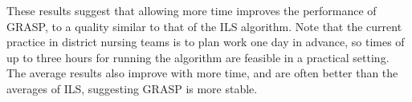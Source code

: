 \documentclass[a4paper,11pt,authoryear]{elsarticle}
\begin{document}
\noindent These results suggest that allowing more time improves the performance of GRASP, to a quality similar to that of the ILS algorithm. Note that the current practice in district nursing teams is to plan work one day in advance, so times of up to three hours for running the algorithm are feasible in a practical setting. The average results also improve with more time, and are often better than the averages of ILS, suggesting GRASP is more stable.

\begin{comment}
\begin{algorithm}[htbp!]
\footnotesize
\caption{\textsc{FindValidTime}$(i, j, f, a(i,j))$}
\label{alg:oldfindvalidtime}
\begin{algorithmic}[1]
\State \chng{all $e/l_j^{(i')}$ need to change to $e/l_j^{(j')}$ where $j'$ is the other dep/ds job done by nurse $i'$}
\State $\tilde{f} \gets f$
\State $\tilde{a}(i,j) \gets a(i,j)$
\State valid $\gets \False$
\State DS $\gets \False$
\State second $\gets \False$
\If{$j$ is a double service}
\State DS $\gets \True$
\State $i' \gets$ other nurse assigned to $j$
\If{$i$ appears later than $i'$ in $\mathcal{O}$}
\State second $\gets \True$
\If{$\tilde{a}(i,j) > l_j^{(i')}$} %
\State valid $\gets \False$
\Return
\EndIf
\EndIf
\EndIf %
\While{$\Not$ valid}
\State $\tilde{f} \gets \tilde{f}+1$
\State $\tilde{a}(i,j) \gets u(\pi_{\tilde{f}}^{i})$
\If{\chng{DS $= \True$ or j is synchronised}} %
\If{second $= \False$}
\If{$\tilde{a}(i,j) + s_j > v(\pi_{\tilde{f}}^{i}) \AAnd \tilde{f} \neq g_i$}
\Continue
\Else
\State valid $\gets \True$
\State $t_j \gets \tilde{a}(i,j)$
\State $w_{ij} \gets t_j - a(i,j)$
\State $z_j \gets t_j - l_j$
\State $f \gets \tilde{f}$
\EndIf
\ElsIf{second $= \True$}
\State $[e_j^{(i')}, l_j^{(i')}] \gets$ dependent time window, based on $t_j$ set by nurse $i'$.
\If{$\tilde{a}(i,j) > l_j^{(i')}$} %
\State valid $\gets \False$
\Break
\ElsIf{$l_j^{(i')} + s_j > v(\pi_{\tilde{f}}^{i}) \AAnd \tilde{f} \neq g_i$}
\Continue
\Else
\State valid $\gets \True$
\State $w_{ij} \gets t_j - a(i,j)$
\State $f \gets \tilde{f}$
\EndIf
\EndIf %
\ElsIf{DS $= \False$}
\If{$\tilde{a}(i,j) + s_j > v(\pi_{\tilde{f}}^{i}) \AAnd \tilde{f} \neq g_i$}
\Continue
\Else
\State valid $\gets \True$
\State $t_j \gets \tilde{a}(i,j)$
\State $w_{ij} \gets t_j - a(i,j)$
\State $z_j \gets t_j - l_j$
\State $f \gets \tilde{f}$
\EndIf
\EndIf %
\EndWhile
\Return either infeasible or starting time $t_j$, shift $f$, waiting time $w_{ij}$ and tardiness $z_j$
\end{algorithmic}
\end{algorithm}
\end{comment}
\end{document}
